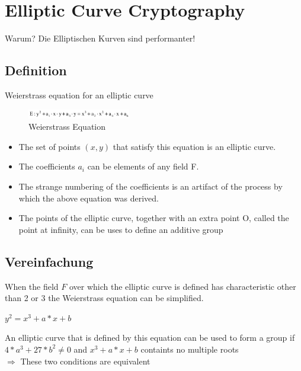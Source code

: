 \hypertarget{elliptic-curve-cryptography}{%
\section{Elliptic Curve
Cryptography}\label{elliptic-curve-cryptography}}

Warum? Die Elliptischen Kurven sind performanter!

\hypertarget{definition}{%
\subsection{Definition}\label{definition}}

Weierstrass equation for an elliptic curve

\begin{figure}[H]
\centering
\includegraphics[width=0.4\textwidth]{figures/weierstrasseEquation.png}
\caption{Weierstrass Equation}
\end{figure}

\begin{itemize}
\tightlist
\item
  The set of points $(x,y)$ that satisfy this equation is an elliptic
  curve.
\item
  The coefficients $a_i$ can be elements of any field F.
\item
  The strange numbering of the coefficients is an artifact of the
  process by which the above equation was derived.
\item
  The points of the elliptic curve, together with an extra point O,
  called the point at infinity, can be uses to define an additive group
\end{itemize}

\hypertarget{vereinfachung}{%
\subsection{Vereinfachung}\label{vereinfachung}}

When the field $F$ over which the elliptic curve is defined has
characteristic other than 2 or 3 the Weierstrass equation can be
simplified.

\begin{tcolorbox}[colback=red!5!white,colframe=red!75!black]
    $y^2 = x^3 + a * x + b$
    
    An elliptic curve that is defined by this equation can be used to form a group if \\
    $4 * a^3 + 27 * b^2 \neq 0$ and $x^3 + a * x + b$ containts no multiple roots  \\
    $\Rightarrow$ These two conditions are equivalent
\end{tcolorbox}

